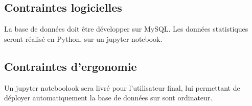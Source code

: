 \documentclass[french]{article}
\begin{document}
\subsection{Contraintes logicielles}

La base de données doit être développer sur MySQL. Les données statistiques seront réalisé en Python, sur un jupyter notebook.

\subsection{Contraintes d'ergonomie}

Un jupyter noteboolook sera livré pour l'utilisateur final, lui permettant de déployer automatiquement la base de données sur sont ordinateur.
\end{document}
